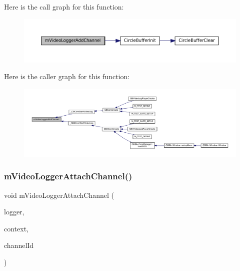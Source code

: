 Here is the call graph for this function\+:
\nopagebreak
\begin{figure}[H]
\begin{center}
\leavevmode
\includegraphics[width=350pt]{video-logger_8c_a27685ba414aed35c5b92736c0ef21ebe_cgraph}
\end{center}
\end{figure}
Here is the caller graph for this function\+:
\nopagebreak
\begin{figure}[H]
\begin{center}
\leavevmode
\includegraphics[width=350pt]{video-logger_8c_a27685ba414aed35c5b92736c0ef21ebe_icgraph}
\end{center}
\end{figure}
\mbox{\label{video-logger_8c_ab35cded24430e8df5eea72310c1827be}} 
\subsubsection{\texorpdfstring{m\+Video\+Logger\+Attach\+Channel()}{mVideoLoggerAttachChannel()}}
{\footnotesize\ttfamily void m\+Video\+Logger\+Attach\+Channel (\begin{DoxyParamCaption}\item[{struct m\+Video\+Logger $\ast$}]{logger,  }\item[{struct m\+Video\+Log\+Context $\ast$}]{context,  }\item[{size\+\_\+t}]{channel\+Id }\end{DoxyParamCaption})}

